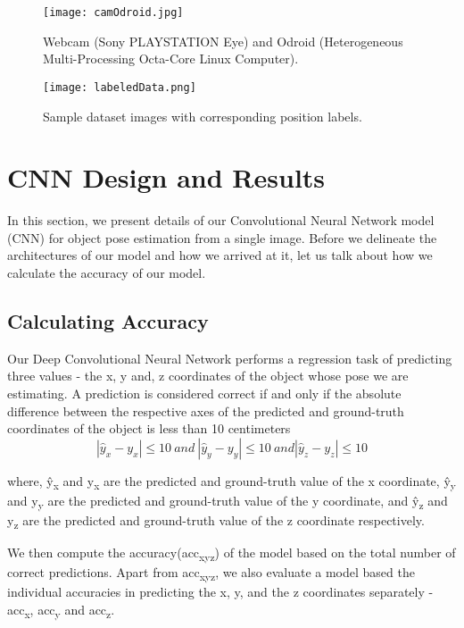 \documentclass{article}
\begin{document}
\begin{figure}[h]
  \centering
  \texttt{[image: camOdroid.jpg]}
  \caption{Webcam (Sony PLAYSTATION Eye) and Odroid (Heterogeneous Multi-Processing Octa-Core Linux Computer).}
  \label{fig:webcam}
\end{figure}

\begin{figure}[h]
  \centering
  \texttt{[image: labeledData.png]}
  \caption{Sample dataset images with corresponding position labels.}
  \label{fig:sampledata}
\end{figure}

\section{CNN Design and Results}
\label{design_results}
In this section, we present details of our Convolutional Neural Network model (CNN) for object pose estimation from a single image. Before we delineate the architectures of our model and how we arrived at it, let us talk about how we calculate the accuracy of our model.

\subsection{Calculating Accuracy}
Our Deep Convolutional Neural Network performs a regression task of predicting three values - the x, y and, z coordinates of the object whose pose we are estimating. A prediction is considered correct if and only if the absolute difference between the respective axes of the predicted and ground-truth coordinates of the object is less than 10 centimeters
$$\left|\hat{y}_{x} - y_{x}\right| \le 10\ and\ \left|\hat{y}_{y} - y_{y}\right| \le 10\ and \left|\hat{y}_{z} - y_{z}\right| \le 10$$

where, ŷ\textsubscript{x} and y\textsubscript{x} are the predicted and ground-truth value of the x coordinate,
ŷ\textsubscript{y} and y\textsubscript{y} are the predicted and ground-truth value of the y coordinate, and ŷ\textsubscript{z} and y\textsubscript{z} are the predicted and ground-truth value of the z coordinate respectively.

We then compute the accuracy(acc\textsubscript{xyz}) of the model based on the total number of correct predictions. Apart from acc\textsubscript{xyz}, we also evaluate a model based the individual accuracies in predicting the x, y, and the z coordinates separately - acc\textsubscript{x}, acc\textsubscript{y} and acc\textsubscript{z}.
\end{document}
